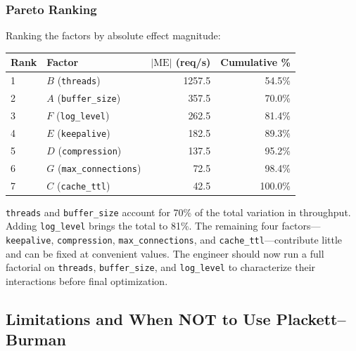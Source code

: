 \documentclass[11pt]{book}
\begin{document}
\subsubsection{Pareto Ranking}

Ranking the factors by absolute effect magnitude:

\begin{center}
\begin{tabular}{llrr}
\toprule
Rank & Factor & $|\text{ME}|$ (req/s) & Cumulative \% \\
\midrule
1 & $B$ (\texttt{threads}) & 1257.5 & 54.5\% \\
2 & $A$ (\texttt{buffer\_size}) & 357.5 & 70.0\% \\
3 & $F$ (\texttt{log\_level}) & 262.5 & 81.4\% \\
4 & $E$ (\texttt{keepalive}) & 182.5 & 89.3\% \\
5 & $D$ (\texttt{compression}) & 137.5 & 95.2\% \\
6 & $G$ (\texttt{max\_connections}) & 72.5 & 98.4\% \\
7 & $C$ (\texttt{cache\_ttl}) & 42.5 & 100.0\% \\
\bottomrule
\end{tabular}
\end{center}

\texttt{threads} and \texttt{buffer\_size} account for 70\% of the total
variation in throughput. Adding \texttt{log\_level} brings the total to 81\%.
The remaining four factors---\texttt{keepalive}, \texttt{compression},
\texttt{max\_connections}, and \texttt{cache\_ttl}---contribute little and can
be fixed at convenient values. The engineer should now run a full factorial on
\texttt{threads}, \texttt{buffer\_size}, and \texttt{log\_level} to
characterize their interactions before final optimization.

\subsection{Limitations and When NOT to Use Plackett--Burman}
\end{document}
